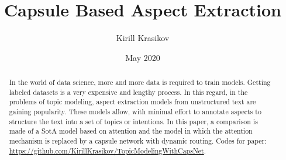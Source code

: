 \documentclass{article}
\title{Capsule Based Aspect Extraction}
\author{Kirill Krasikov}
\date{May 2020}
\begin{document}
\maketitle
\begin{abstract}
    In the world of data science, more and more data is required to train models. Getting labeled datasets is a very expensive and lengthy process. In this regard, in the problems of topic modeling, aspect extraction models from unstructured text are gaining popularity. These models allow, with minimal effort to annotate aspects to structure the text into a set of topics or intentions. In this paper, a comparison is made of a SotA model based on attention and the model in which the attention mechanism is replaced by a capsule network with dynamic routing.
    Codes for paper: \url{https://github.com/KirillKrasikov/TopicModelingWithCapsNet}.
\end{abstract}
\end{document}
